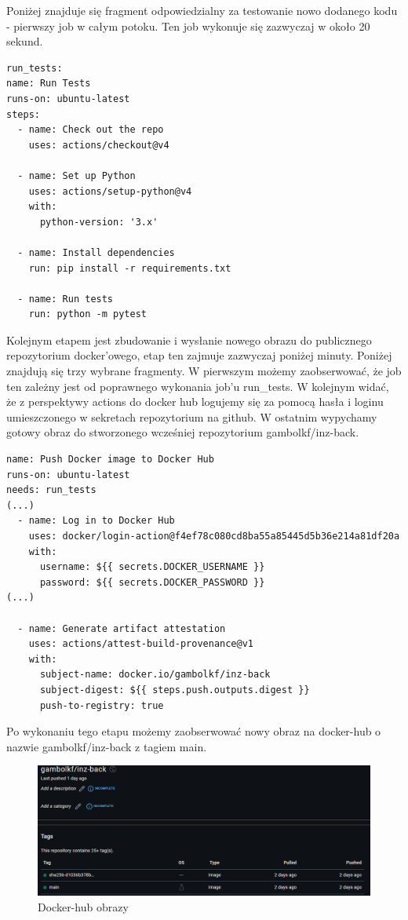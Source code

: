 Poniżej znajduje się fragment odpowiedzialny za testowanie nowo dodanego kodu - pierwszy job w całym potoku. Ten job wykonuje się zazwyczaj w około 20 sekund.
\begin{verbatim}
run_tests:
name: Run Tests
runs-on: ubuntu-latest
steps:
  - name: Check out the repo
    uses: actions/checkout@v4

  - name: Set up Python
    uses: actions/setup-python@v4
    with:
      python-version: '3.x'
  
  - name: Install dependencies
    run: pip install -r requirements.txt
  
  - name: Run tests
    run: python -m pytest
\end{verbatim}
Kolejnym etapem jest zbudowanie i wysłanie nowego obrazu do publicznego repozytorium docker'owego, etap ten zajmuje zazwyczaj poniżej minuty. Poniżej znajdują się trzy wybrane fragmenty. W pierwszym możemy zaobserwować, że job ten zależny jest od poprawnego wykonania job'u run\_tests. W kolejnym widać, że z perspektywy actions do docker hub logujemy się za pomocą hasła i loginu umieszczonego w sekretach repozytorium na github. W ostatnim wypychamy gotowy obraz do stworzonego wcześniej repozytorium gambolkf/inz-back.
\begin{verbatim}
name: Push Docker image to Docker Hub
runs-on: ubuntu-latest
needs: run_tests
(...)
  - name: Log in to Docker Hub
    uses: docker/login-action@f4ef78c080cd8ba55a85445d5b36e214a81df20a
    with:
      username: ${{ secrets.DOCKER_USERNAME }}
      password: ${{ secrets.DOCKER_PASSWORD }}
(...)

  - name: Generate artifact attestation
    uses: actions/attest-build-provenance@v1
    with:
      subject-name: docker.io/gambolkf/inz-back
      subject-digest: ${{ steps.push.outputs.digest }}
      push-to-registry: true
\end{verbatim}
Po wykonaniu tego etapu możemy zaobserwować nowy obraz na docker-hub o nazwie gambolkf/inz-back z tagiem main.

\begin{figure}[H]
    \centering
    \includegraphics[width=0.75\linewidth]{img/docker-hub-screen.png}
    \caption{Docker-hub obrazy}
    \label{fig:docker0hub-img}
\end{figure}



